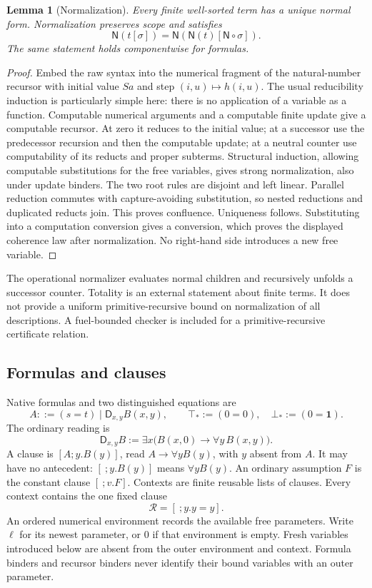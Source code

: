 \documentclass[11pt,letterpaper]{article}
\newtheorem{lemma}[theorem]{Lemma}
\theoremstyle{definition}\newtheorem{definition}[theorem]{Definition}
\theoremstyle{remark}\newtheorem{remark}[theorem]{Remark}
\newcommand{\NF}{\mathsf N}
\newcommand{\DD}{\mathsf D}
\newcommand{\one}{\mathbf 1}
\newcommand{\ttop}{\top_*}
\newcommand{\bbot}{\bot_*}
\begin{document}
\begin{lemma}[Normalization]\label{lem:nf}
Every finite well-sorted term has a unique normal form. Normalization
preserves scope and satisfies
\[
 \NF(t[\sigma])=\NF(\NF(t)[\NF\circ\sigma]).
\]
The same statement holds componentwise for formulas.
\end{lemma}
\begin{proof}
Embed the raw syntax into the numerical fragment of the natural-number
recursor with initial value $Sa$ and step $(i,u)\mapsto h(i,u)$.
The usual reducibility induction is particularly simple here: there is
no application of a variable as a function. Computable numerical
arguments and a computable finite update give a computable recursor.
At zero it reduces to the initial value; at a successor use the
predecessor recursion and then the computable update; at a neutral
counter use computability of its reducts and proper subterms.
Structural induction, allowing computable substitutions for the free
variables, gives strong normalization, also under update binders.
The two root rules are disjoint and left linear. Parallel reduction
commutes with capture-avoiding substitution, so nested reductions and
duplicated reducts join. This proves confluence. Uniqueness follows.
Substituting into a computation conversion gives a conversion, which
proves the displayed coherence law after normalization. No right-hand
side introduces a new free variable.
\end{proof}

The operational normalizer evaluates normal children and recursively
unfolds a successor counter. Totality is an external statement about
finite terms. It does not provide a uniform primitive-recursive bound on
normalization of all descriptions. A fuel-bounded checker is included
for a primitive-recursive certificate relation.

\subsection{Formulas and clauses}
Native formulas and two distinguished equations are
\[
 A::=(s=t)\mid\DD_{x,y}B(x,y),\qquad
 \ttop:=(0=0),\quad\bbot:=(0=\one).
\]
The ordinary reading is
\begin{equation}\label{eq:d-reading}
 \DD_{x,y}B:=\exists x\bigl(B(x,0)\to\forall y\,B(x,y)\bigr).
\end{equation}
A clause is $[A;y.B(y)]$, read $A\to\forall yB(y)$, with $y$ absent
from $A$. It may have no antecedent: $[\ ;y.B(y)]$ means $\forall yB(y)$.
An ordinary assumption $F$ is the constant clause $[\ ;v.F]$.
Contexts are finite reusable lists of clauses. Every context contains
the one fixed clause
\begin{equation}\label{eq:refl}
                  \mathcal R=[\ ;y.y=y].
\end{equation}
An ordered numerical environment records the available free parameters.
Write $\ell$ for its newest parameter, or $0$ if that environment is empty.
Fresh variables introduced below are absent from the outer environment
and context. Formula binders and recursor binders never identify their
bound variables with an outer parameter.
\end{document}
